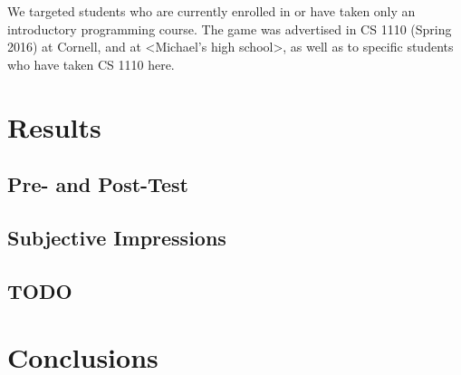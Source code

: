 \documentclass[12pt,notitlepage]{article}
\begin{document}
We targeted students who are currently enrolled in or have taken only
an introductory programming course. The game was advertised in CS 1110
(Spring 2016) at Cornell, and at <Michael's high school>, as well as
to specific students who have taken CS 1110 here.

\section{Results}

\subsection{Pre- and Post-Test}

\subsection{Subjective Impressions}

\subsection{TODO}

\section{Conclusions}
\end{document}
